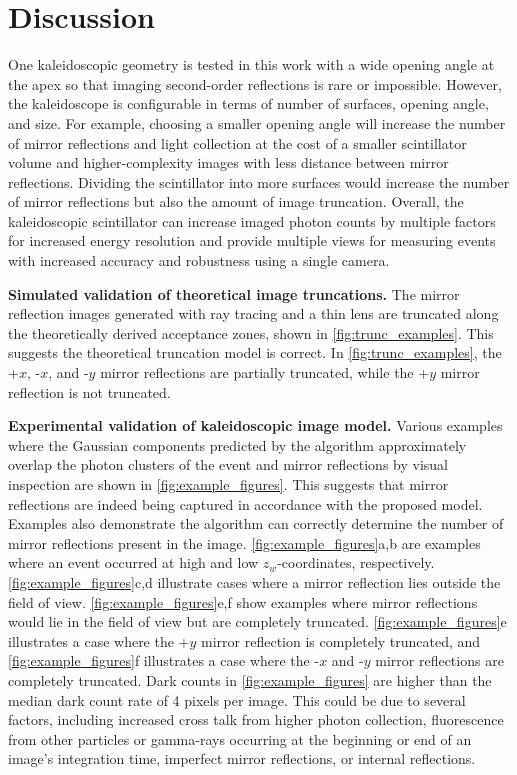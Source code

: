 \section{Discussion}

One kaleidoscopic geometry is tested in this work with a wide opening angle at the 
apex so that imaging second-order reflections is rare or impossible. 
However, the kaleidoscope is configurable in terms of number of surfaces, opening 
angle, and size.
For example, choosing a smaller opening angle will increase the number of mirror 
reflections and light collection at the cost of a smaller scintillator volume and 
higher-complexity images with less distance between mirror reflections.
Dividing the scintillator into more surfaces would increase the number of mirror 
reflections but also the amount of image truncation.
Overall, the kaleidoscopic scintillator can increase imaged photon counts by 
multiple factors for increased energy resolution and provide multiple views for 
measuring events with increased accuracy and robustness using a single camera.

\noindent
\textbf{Simulated validation of theoretical image truncations.}
The mirror reflection images generated with ray tracing and a thin lens are 
truncated along the theoretically derived acceptance zones, shown in \cref{fig:trunc_examples}. 
This suggests the theoretical truncation model is correct.
In \cref{fig:trunc_examples}, the +$x$, -$x$, and -$y$ mirror reflections are 
partially truncated, while the +$y$ mirror reflection is not truncated.

\noindent
\textbf{Experimental validation of kaleidoscopic image model.}
Various examples where the Gaussian components predicted by the 
algorithm approximately overlap the photon clusters of the event and mirror 
reflections by visual inspection are shown in \cref{fig:example_figures}.
This suggests that mirror reflections are indeed being captured in accordance with 
the proposed model.
Examples also demonstrate the algorithm can correctly determine the number of 
mirror reflections present in the image.
\cref{fig:example_figures}a,b are examples where an event occurred at high and 
low $z_w$-coordinates, respectively.
\cref{fig:example_figures}c,d illustrate cases where a mirror reflection lies 
outside the field of view. 
\cref{fig:example_figures}e,f show examples where mirror reflections would lie in 
the field of view but are completely truncated.
\cref{fig:example_figures}e illustrates a case where the +$y$ mirror reflection is 
completely truncated, and \cref{fig:example_figures}f illustrates a case where the 
-$x$ and -$y$ mirror reflections are completely truncated.
Dark counts in \cref{fig:example_figures} are higher than the median dark count 
rate of 4 pixels per image.
This could be due to several factors, including increased cross talk from higher 
photon collection, fluorescence from other particles or gamma-rays occurring at 
the beginning or end of an image's integration time, imperfect mirror reflections, 
or internal reflections.

